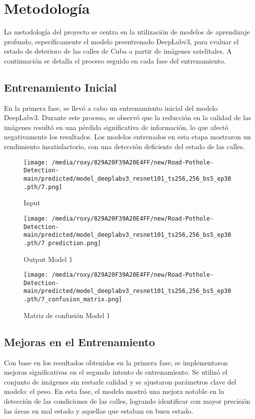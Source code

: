 \documentclass{article}
\begin{document}
\section{Metodología}
La metodología del proyecto se centra en la utilización de modelos de aprendizaje profundo, específicamente el modelo preentrenado DeepLabv3, para evaluar el estado de deterioro de las calles de Cuba a partir de imágenes satelitales. A continuación se detalla el proceso seguido en cada fase del entrenamiento.

\subsection{Entrenamiento Inicial}
En la primera fase, se llevó a cabo un entrenamiento inicial del modelo DeepLabv3. Durante este proceso, se observó que la reducción en la calidad de las imágenes resultó en una pérdida significativa de información, lo que afectó negativamente los resultados. Los modelos entrenados en esta etapa mostraron un rendimiento insatisfactorio, con una detección deficiente del estado de las calles.


\begin{figure}
    \centering
    \texttt{[image: /media/roxy/829A20F39A20E4FF/new/Road-Pothole-Detection-main/predicted/model\_deeplabv3\_resnet101\_ts256,256\_bs5\_ep30.pth/7.png]} %
    \caption{Input} %
    \label{fig:input} %
\end{figure}

\begin{figure}
    \centering
    \texttt{[image: /media/roxy/829A20F39A20E4FF/new/Road-Pothole-Detection-main/predicted/model\_deeplabv3\_resnet101\_ts256,256\_bs5\_ep30.pth/7 prediction.png]} %
    \caption{Output Model 1} %
    \label{fig:input} %
\end{figure}

\begin{figure} 
    \centering
    \texttt{[image: /media/roxy/829A20F39A20E4FF/new/Road-Pothole-Detection-main/predicted/model\_deeplabv3\_resnet101\_ts256,256\_bs5\_ep30.pth/7\_confusion\_matrix.png]} %
    \caption{Matriz de confusión Model 1} %
    \label{fig:matriz_confusion} %
\end{figure}

\subsection{Mejoras en el Entrenamiento}
Con base en los resultados obtenidos en la primera fase, se implementaron mejoras significativas en el segundo intento de entrenamiento. Se utilizó el conjunto de imágenes sin restarle calidad y se ajustaron parámetros clave del modelo: el peso. En esta fase, el modelo mostró una mejora notable en la detección de las condiciones de las calles, logrando identificar con mayor precisión las áreas en mal estado y aquellas que estaban en buen estado.
\end{document}
